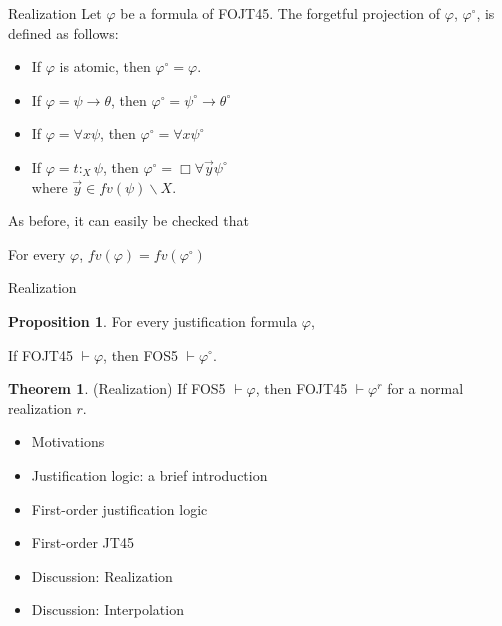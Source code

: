 \documentclass{beamer}
\theoremstyle{definition}
\newtheorem{teor}{Theorem}
\newtheorem{pro}{Proposition}
\newcommand{\impli}{\rightarrow}
\newcommand{\todo}{\forall}
\newcommand{\teo}{\vdash}
\begin{document}
\begin{frame}{Realization}
\qquad Let $\varphi$ be a formula of FOJT45. {\color{blue}The forgetful projection} of $\varphi$, $\varphi^{\circ}$, is defined as follows:


\begin{itemize}
\item If $\varphi$ is atomic, then $\varphi^{\circ} = \varphi$.
\item If $\varphi = \psi\impli\theta$, then $\varphi^{\circ} = \psi^{\circ}\impli\theta^{\circ}$
\item If $\varphi = \todo x \psi$, then $\varphi^{\circ} = \todo x \psi^{\circ}$
\item If $\varphi = t$$:_{X}$$ \psi$, then $\varphi^{\circ} = \Box \todo \vec{y}\psi^{\circ}$\\ where $\vec{y} \in fv(\psi)\backslash X$.
\end{itemize}

\qquad As before, it can easily be checked that

\begin{center}
	For every $\varphi$, $fv(\varphi) = fv(\varphi^{\circ})$
\end{center}	
\end{frame}




\begin{frame}{Realization}

\begin{pro}
For every justification formula $\varphi$,
\begin{center}
If FOJT45 $\teo \varphi$, then FOS5 $\teo \varphi^{\circ}$.
\end{center}
\end{pro}	

\begin{teor}
(Realization) If FOS5 $\teo \varphi$, then FOJT45 $\teo \varphi^{r}$ for a normal realization $r$.
\end{teor}	
\end{frame}



\begin{frame}
	\begin{itemize}
		\item[] Motivations
		\vspace{5mm}
		\item[] Justification logic: a brief introduction
		\vspace{5mm}
		\item[] First-order justification logic
		\vspace{5mm}
		\item[] First-order JT45
		\vspace{5mm}
		\item[] Discussion: Realization
		\vspace{5mm}
		\item[] {\color{blue}Discussion: Interpolation}
	\end{itemize} 
\end{frame}
\end{document}
